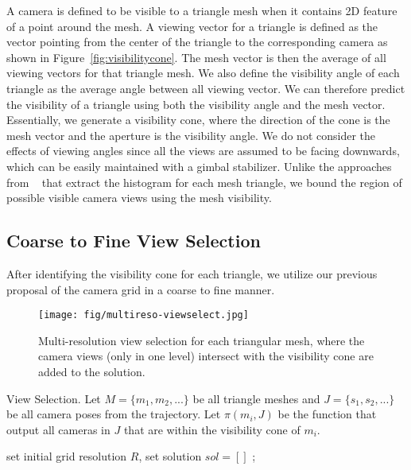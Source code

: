 A camera is defined to be visible to a triangle mesh when it contains 2D feature of a point around the mesh. A viewing vector for a triangle is defined as the vector pointing from the center of the triangle to the corresponding camera as shown in Figure~\ref{fig:visibilitycone}. 
The mesh vector is then the average of all viewing vectors for that triangle mesh. We also define the visibility angle of each triangle as the average angle between all viewing vector. 
We can therefore predict the visibility of a triangle using both the visibility angle and the mesh vector. Essentially, we generate a visibility cone, where the direction of the cone is the mesh vector and the aperture is the visibility angle. We do not consider the effects of viewing angles since all the views are assumed to be facing downwards, which can be easily maintained with a gimbal stabilizer. 
Unlike the approaches from ~\cite{hoppe2012photogrammetric} that extract the histogram for each mesh triangle, we bound the region of possible visible camera views using the mesh visibility.

\subsection{Coarse to Fine View Selection}
\label{sec:viewselection}
After identifying the visibility cone for each triangle, we utilize our previous proposal of the camera grid in a coarse to fine manner.
\begin{figure}
    \centering
    \texttt{[image: fig/multireso-viewselect.jpg]}
    \caption{Multi-resolution view selection for each triangular mesh, where the camera views (only in one level) intersect with the visibility cone are added to the solution.}
    \label{fig:multireso}
\end{figure}

\begin{algorithm}
\caption{View Selection. Let $M = \{m_1,m_2,...\}$ be all triangle meshes and $J = \{s_1,s_2,...\}$ be all camera poses from the trajectory. Let $\pi(m_i,J)$ be the function that output all cameras in $J$ that are within the visibility cone of  $m_i$.}
\begin{algorithmic}
\REQUIRE set initial grid resolution $R$, set solution $sol=[]$
        \ENDIF
    \ENDFOR
    ;
\ENDWHILE
{}
\end{algorithmic}
\end{algorithm}

